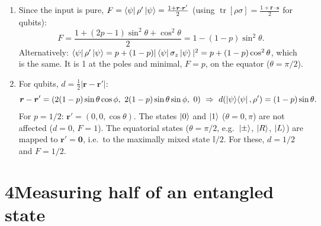 \documentclass[11pt,a4paper]{article}
\newcommand{\tr}{\operatorname{tr}}
\newcommand{\id}{\mathbb{I}}
\begin{document}
\begin{enumerate}
\item Since the input is pure, $F=\bra\psi\rho'\ket\psi=\frac{1+\bm r\cdot\bm r'}{2}$
(using $\tr[\rho\sigma]=\frac{1+\bm r\cdot\bm s}{2}$ for qubits):
\[
F=\frac{1+(2p-1)\sin^2\theta+\cos^2\theta}{2}=1-(1-p)\sin^2\theta .
\]
Alternatively: $\bra\psi\rho'\ket\psi=p+(1-p)|\bra\psi\sigma_z\ket\psi|^2=p+(1-p)\cos^2\theta$, which is the same.
It is 1 at the poles and minimal, $F=p$, on the equator ($\theta=\pi/2$).

\item For qubits, $d=\frac12|\bm r-\bm r'|$:
\[
\bm r-\bm r'=\left(2(1-p)\sin\theta\cos\phi,\ 2(1-p)\sin\theta\sin\phi,\ 0\right)
\ \Rightarrow\ d(\ket\psi\!\bra\psi,\rho')=(1-p)\sin\theta .
\]
For $p=1/2$: $\bm r'=(0,0,\cos\theta)$. The states $\ket0$ and $\ket1$ ($\theta=0,\pi$) are not
affected ($d=0$, $F=1$). The equatorial states ($\theta=\pi/2$, e.g.\ $\ket\pm$, $\ket{R}$, $\ket{L}$) are
mapped to $\bm r'=\bm 0$, i.e.\ to the maximally mixed state $\id/2$. For these, $d=1/2$ and $F=1/2$.
\end{enumerate}

\section*{4\quad Measuring half of an entangled state}
\end{document}
